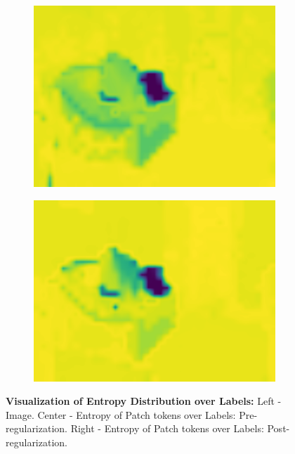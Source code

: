 \begin{figure}[t]
\begin{subfigure}{0.3\textwidth}
    \includegraphics[width=\linewidth]{figures/experiments/entropymaps/finetuned/10/class_entropywithoutcb.pdf}
\end{subfigure}
\begin{subfigure}{0.3\textwidth}
    \centering
    \includegraphics[width=\linewidth]{figures/experiments/entropymaps/er/10/class_entropywithoutcb.pdf}
\end{subfigure}
\caption[\textbf{Visualization of Entropy Distribution over Labels}]{\textbf{Visualization of Entropy Distribution over Labels:} Left - Image. Center - Entropy of Patch tokens over Labels: Pre-regularization. Right - Entropy of Patch tokens over Labels: Post-regularization.}
\label{fig:labeler}
\end{figure}


